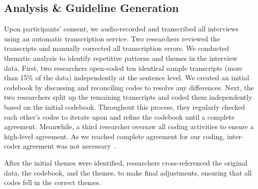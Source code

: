 \subsection{Analysis \& Guideline Generation} \label{analysis_phase1}
Upon participants' consent, we audio-recorded and transcribed all interviews using an automatic transcription service. Two researchers reviewed the transcripts and manually corrected all transcription errors. We conducted thematic analysis \cite{Braun2006Thematic, Clarke2015Thematic} to identify repetitive patterns and themes in the interview data. First, two researchers open-coded ten identical sample transcripts (more than 15\% of the data) independently at the sentence level. We created an initial codebook by discussing and reconciling codes to resolve any differences. Next, the two researchers split up the remaining transcripts and coded them independently based on the initial codebook. Throughout this process, they regularly checked each other's codes to iterate upon and refine the codebook until a complete agreement. Meanwhile, a third researcher oversaw all coding activities to ensure a high-level agreement. As we reached complete agreement for our coding, inter-coder agreement was not necessary~\cite{mcdonald2019reliability}. 

After the initial themes were identified, researchers cross-referenced the original data, the codebook, and the themes, to make final adjustments, ensuring that all codes fell in the correct themes. %
